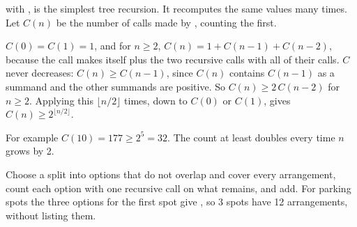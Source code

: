 \documentclass[10pt]{scrartcl}
\begin{document}
\begin{example*}
 with ,  is the simplest tree recursion. It recomputes the same values many times. Let $C(n)$ be the number of calls made by , counting the first.
\begin{steps}
  \ii $C(0)=C(1)=1$, and for $n\ge2$, $C(n) = 1 + C(n-1) + C(n-2)$, because the call makes itself plus the two recursive calls with all of their calls.
  \ii $C$ never decreases: $C(n) \ge C(n-1)$, since $C(n)$ contains $C(n-1)$ as a summand and the other summands are positive.
  \ii So $C(n) \ge 2\,C(n-2)$ for $n\ge2$. Applying this $\lfloor n/2\rfloor$ times, down to $C(0)$ or $C(1)$, gives $C(n)\ge 2^{\lfloor n/2\rfloor}$.
\end{steps}
For example $C(10) = 177 \ge 2^5 = 32$. The count at least doubles every time $n$ grows by 2.
\end{example*}
\revisit Choose a split into options that do not overlap and cover every arrangement, count each option with one recursive call on what remains, and add. For parking spots the three options for the first spot give , so 3 spots have 12 arrangements, without listing them.
\end{document}
